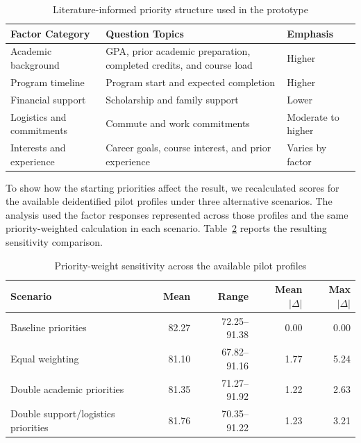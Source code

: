 \documentclass[letterpaper,11pt]{article}
\begin{document}
\begin{table}[htbp]
\caption{Literature-informed priority structure used in the prototype}
\label{tab:priority}
\centering
\begin{tabular}{@{}p{3.4cm}p{8.0cm}p{2.4cm}@{}}
\toprule
\textbf{Factor Category} & \textbf{Question Topics} & \textbf{Emphasis} \\
\midrule
Academic background & GPA, prior academic preparation, completed credits, and course load & Higher \\
\addlinespace[2pt]
Program timeline & Program start and expected completion & Higher \\
\addlinespace[2pt]
Financial support & Scholarship and family support & Lower \\
\addlinespace[2pt]
Logistics and commitments & Commute and work commitments & Moderate to higher \\
\addlinespace[2pt]
Interests and experience & Career goals, course interest, and prior experience & Varies by factor \\
\bottomrule
\end{tabular}
\end{table}

To show how the starting priorities affect the result, we recalculated scores for the available deidentified pilot profiles under three alternative scenarios. The analysis used the factor responses represented across those profiles and the same priority-weighted calculation in each scenario. Table~\ref{tab:sensitivity} reports the resulting sensitivity comparison.

\begin{table}[htbp]
\caption{Priority-weight sensitivity across the available pilot profiles}
\label{tab:sensitivity}
\centering
\begin{tabular}{@{}p{4.1cm}rrrr@{}}
\toprule
\textbf{Scenario} & \textbf{Mean} & \textbf{Range} & \textbf{Mean $|\Delta|$} & \textbf{Max $|\Delta|$} \\
\midrule
Baseline priorities & 82.27 & 72.25--91.38 & 0.00 & 0.00 \\
Equal weighting & 81.10 & 67.82--91.16 & 1.77 & 5.24 \\
Double academic priorities & 81.35 & 71.27--91.92 & 1.22 & 2.63 \\
Double support/logistics priorities & 81.76 & 70.35--91.22 & 1.23 & 3.21 \\
\bottomrule
\end{tabular}
\end{table}
\end{document}
